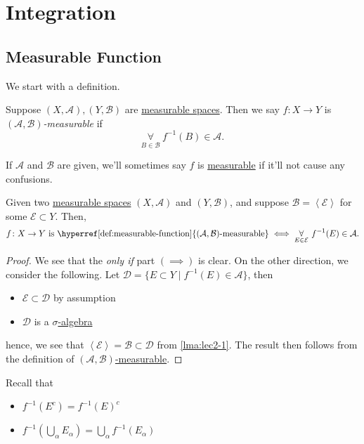 \chapter{Integration}\label{ch:Integration}
\section{Measurable Function}
We start with a definition.

\begin{definition}\label{def:measurable-function}
	Suppose \((X, \mathcal{A} ), (Y, \mathcal{B} )\) are \hyperref[def:measurable-space]{measurable spaces}. Then we say \(f\colon X\to Y\) is
	\emph{\((\mathcal{A} , \mathcal{B} )\)-measurable} if
	\[
		\underset{B\in \mathcal{B}}{\forall}\ f^{-1} (B)\in \mathcal{A}.
	\]
\end{definition}

\begin{remark}
	If \(\mathcal{A} \) and \(\mathcal{B} \) are given, we'll sometimes say \(f\) is \hyperref[def:measurable-function]{measurable}
	if it'll not cause any confusions.
\end{remark}

\begin{lemma}\label{lma:lec10-1}
	Given two \hyperref[def:measurable-space]{measurable spaces} \((X, \mathcal{A} )\) and \((Y, \mathcal{B} )\), and suppose
	\(\mathcal{B} = \left< \mathcal{E}  \right> \) for some \(\mathcal{E} \subset Y\). Then,
	\[
		f\colon X\to Y \text{ is \hyperref[def:measurable-function]{\((\mathcal{A} , \mathcal{B})\)-measurable}}\iff \underset{E\in\mathcal{E}}{\forall}\ f^{-1} (E)\in \mathcal{A}.
	\]
\end{lemma}
\begin{proof}
	We see that the \emph{only if} part \((\implies )\) is clear. On the other direction, we consider the following. Let
	\(\mathcal{D} = \{E\subset Y \mid f^{-1} (E)\in \mathcal{A} \}\), then
	\begin{itemize}
		\item \(\mathcal{E} \subset \mathcal{D} \) by assumption
		\item \(\mathcal{D} \) is a \hyperref[def:sigma-algebra]{\(\sigma\)-algebra} 
	\end{itemize}
	hence, we see that \(\left< \mathcal{E} \right> = \mathcal{B} \subset \mathcal{D} \) from \autoref{lma:lec2-1}. The result then
	follows from the definition of \hyperref[def:measurable-function]{\((\mathcal{A} , \mathcal{B} )\)-measurable}.
\end{proof}
\begin{note}
	Recall that
	\begin{itemize}
		\item \(f^{-1} (E^{c} ) = f^{-1} (E)^{c} \)
		\item \(f^{-1} \left(\bigcup_{\alpha} E_{\alpha }\right) = \bigcup_{\alpha} f^{-1} (E_{\alpha })\)
	\end{itemize}
\end{note}

